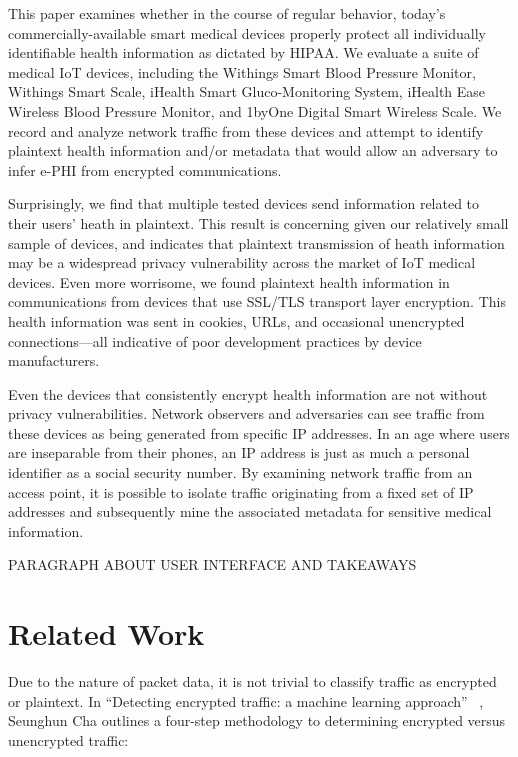 This paper examines whether in the course of regular behavior, today's commercially-available smart medical devices properly protect all individually identifiable health information as dictated by HIPAA.  We evaluate a suite of medical IoT devices, including the Withings Smart Blood Pressure Monitor, Withings Smart Scale, iHealth Smart Gluco-Monitoring System, iHealth Ease Wireless Blood Pressure Monitor, and 1byOne Digital Smart Wireless Scale.  We record and analyze network traffic from these devices and attempt to identify plaintext health information and/or metadata that would allow an adversary to infer e-PHI from encrypted communications.  

Surprisingly, we find that multiple tested devices send information related to their users' heath in plaintext.  This result is concerning given our relatively small sample of devices, and indicates that plaintext transmission of heath information may be a widespread privacy vulnerability across the market of IoT medical devices. 
Even more worrisome, we found plaintext health information in communications from devices that use SSL/TLS transport layer encryption. This health information was sent in cookies, URLs, and occasional unencrypted connections---all indicative of poor development practices by device manufacturers. 

Even the devices that consistently encrypt health information are not without privacy vulnerabilities.  Network observers and adversaries can see traffic from these devices as being generated from specific IP addresses.  In an age where users are inseparable from their phones, an IP address is just as much a personal identifier as a social security number. By examining network traffic from an access point, it is possible to isolate traffic originating from a fixed set of IP addresses and subsequently mine the associated metadata for sensitive medical information. 

PARAGRAPH ABOUT USER INTERFACE AND TAKEAWAYS




\section{Related Work}
Due to the nature of packet data, it is not trivial to classify traffic as encrypted or plaintext. In ``Detecting encrypted traffic: a machine learning approach'' ~\cite{chaMachineLearning}, Seunghun 
Cha outlines a four-step methodology to determining encrypted versus unencrypted traffic:

